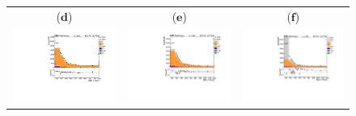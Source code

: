 \begin{figure}[htp]
\begin{tabular}{ccc}
   ($\mathbf{d}$)\qquad\qquad&($\mathbf{e}$)\qquad\qquad\qquad&($\mathbf{f}$)\qquad\qquad\qquad\\
\hspace{-0.5cm}
\includegraphics[scale=0.3]{fig/chapt7/qcd/qcd_e_ch/Mass_H_binned1.pdf}
& \hspace{-1.20cm} \includegraphics[scale=0.3]{fig/chapt7/qcd/qcd_e_ch/Mass_H_binned2.pdf}
& \hspace{-1.20cm} \includegraphics[scale=0.3]{fig/chapt7/qcd/qcd_e_ch/Mass_H_binned3.pdf}\\

\end{tabular}
\end{figure}

